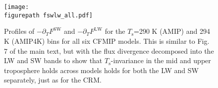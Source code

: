 \documentclass[11pt]{article}
\newcommand{\ppt}{\ensuremath{\partial_T}}
\newcommand{\FLW}{\ensuremath{F^\mathrm{LW}}}
\newcommand{\FSW}{\ensuremath{F^\mathrm{SW}}}
\newcommand{\Ts}{\ensuremath{T_\mathrm{s}}}
\newcommand{\figurepath}{../../figures/}
\begin{document}
\begin{figure}[h!]
	\begin{center}
			\texttt{[image: \\figurepath fswlw\_all.pdf]}
		\caption{ Profiles of $-\ppt \FSW$ and $-\ppt \FLW$ for the \Ts=290 K (AMIP) and 294 K (AMIP4K) bins for all six CFMIP models. This is similar to Fig. 7 of the main text, but with the flux divergence decomposed into the LW and SW bands to show  that \Ts-invariance in the mid and upper troposphere holds across models holds for both the LW and SW separately, just as for the CRM. 
		\label{fswlw_all}
		}
	\end{center}
\end{figure}


%  
%  








				
		
\end{document}
